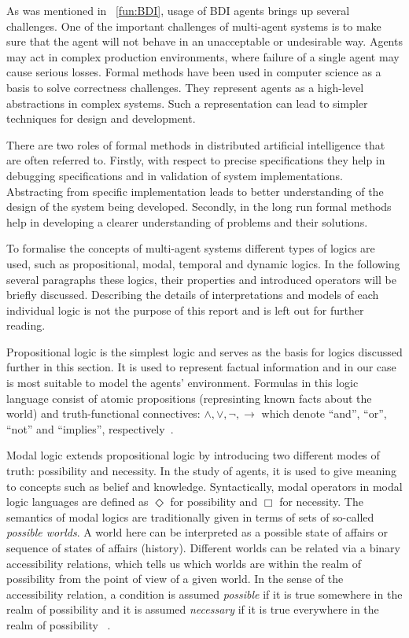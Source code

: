 As was mentioned in ~\autoref{fun:BDI}, usage of BDI agents brings up several challenges.
One of the important challenges of multi-agent systems is to make sure that the agent will not behave in an unacceptable or undesirable way.
Agents may act in complex production environments, where failure of a single agent may cause serious losses.
Formal methods have been used in computer science as a basis to solve correctness challenges.
They represent agents as a high-level abstractions in complex systems.
Such a representation can lead to simpler techniques for design and development.

There are two roles of formal methods in distributed artificial intelligence that are often referred to.
Firstly, with respect to precise specifications they help in debugging specifications and in validation of system implementations.
Abstracting from specific implementation leads to better understanding of the design of the system being developed.
Secondly, in the long run formal methods help in developing a clearer understanding of problems and their solutions. \cite{Singh_99}

To formalise the concepts of multi-agent systems different types of logics are used, such as propositional, modal, temporal and dynamic logics.
In the following several paragraphs these logics, their properties and introduced operators will be briefly discussed.
Describing the details of interpretations and models of each individual logic is not the purpose of this report and is left out for further reading.

Propositional logic is the simplest logic and serves as the basis for logics discussed further in this section.
It is used to represent factual information and in our case is most suitable to model the agents' environment.
Formulas in this logic language consist of atomic propositions (represinting known facts about the world) and truth-functional connectives: $\land,\lor,\neg,\rightarrow$ which denote \enquote{and}, \enquote{or}, \enquote{not} and \enquote{implies}, respectively~\cite{Enderton_72}.

Modal logic extends propositional logic by introducing two different modes of truth: possibility and necessity.
In the study of agents, it is used to give meaning to concepts such as belief and knowledge.
Syntactically, modal operators in modal logic languages are defined as $\Diamond$  for possibility and $\Box$ for necessity.
The semantics of modal logics are traditionally given in terms of sets of so-called \emph{possible worlds}.
A world here can be interpreted as a possible state of affairs or sequence of states of affairs (history).
Different worlds can be related via a binary accessibility relations, which tells us which worlds are within the realm of possibility from the point of view of a given world.
In the sense of the accessibility relation, a condition is assumed \emph{possible} if it is true somewhere in the realm of possibility and it is assumed \emph{necessary} if it is true everywhere in the realm of possibility~ \cite{Saul_63}.

